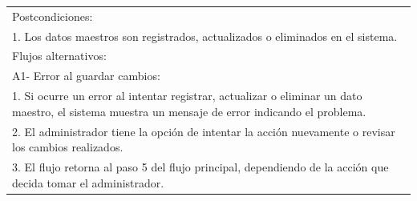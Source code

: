 \documentclass[stu, 12pt, letterpaper, donotrepeattitle, floatsintext, natbib]{apa7}
\begin{document}
\begin{longtable}{@{} p{16.5cm} @{}}
    Postcondiciones:                                                                                                                                                                         \\
    1. Los datos maestros son registrados, actualizados o eliminados en el sistema.                                                                                                          \\ \midrule
    Flujos alternativos:                                                                                                                                                                     \\
    A1- Error al guardar cambios:                                                                                                                                                            \\
    \hspace{1cm}1. Si ocurre un error al intentar registrar, actualizar o eliminar un dato maestro, el sistema muestra un mensaje de error indicando el problema.                            \\
    \hspace{1cm}2. El administrador tiene la opción de intentar la acción nuevamente o revisar los cambios realizados.                                                                       \\
    \hspace{1cm}3. El flujo retorna al paso 5 del flujo principal, dependiendo de la acción que decida tomar el administrador.                                                               \\ \bottomrule
\end{longtable}
\newpage
\end{document}
